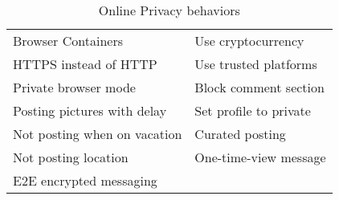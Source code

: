 \begin{table}[H]
\begin{tabular}{ |p{7.5cm}||p{7.5cm}|  }
    Browser Containers & Use cryptocurrency\\
    HTTPS instead of HTTP & Use trusted platforms\\
    Private browser mode & Block comment section\\
    Posting pictures with delay & Set profile to private\\
    Not posting when on vacation & Curated posting\\
    Not posting location & One-time-view message\\
    E2E encrypted messaging  & \\
\hline      
\end{tabular}
\caption{Online Privacy behaviors}
    \label{tab:meng_t1}
\end{table}